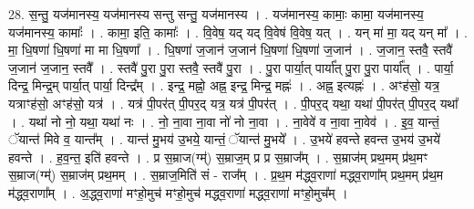 \documentclass[17pt]{extarticle}
\begin{document}
28. स॒न्तु॒ यज॑मानस्य॒ यज॑मानस्य सन्तु सन्तु॒ यज॑मानस्य । . यज॑मानस्य॒ कामाः॒ कामा॒ यज॑मानस्य॒ यज॑मानस्य॒ कामाः᳚ । . कामा॒ इति॒ कामाः᳚ । . वि॒वेष॒ यद् यद् वि॒वेष॑ वि॒वेष॒ यत् । . यन् मा॑ मा॒ यद् यन् मा᳚ । . मा॒ धि॒षणा॑ धि॒षणा॑ मा मा धि॒षणा᳚ । . धि॒षणा॑ ज॒जान॑ ज॒जान॑ धि॒षणा॑ धि॒षणा॑ ज॒जान॑ । . ज॒जान॒ स्तवै॒ स्तवै॑ ज॒जान॑ ज॒जान॒ स्तवै᳚ । . स्तवै॑ पु॒रा पु॒रा स्तवै॒ स्तवै॑ पु॒रा । . पु॒रा पार्या॒त् पार्या᳚त् पु॒रा पु॒रा पार्या᳚त् । . पार्या॒ दिन्द्र॒ मिन्द्र॒म् पार्या॒त् पार्या॒ दिन्द्र᳚म् । . इन्द्र॒ मह्नो॒ अह्न॒ इन्द्र॒ मिन्द्र॒ मह्नः॑ । . अह्न॒ इत्यह्नः॑ । . अꣳह॑सो॒ यत्र॒ यत्राꣳह॑सो॒ अꣳह॑सो॒ यत्र॑ । . यत्र॑ पी॒पर॑त् पी॒पर॒द् यत्र॒ यत्र॑ पी॒पर॑त् । . पी॒पर॒द् यथा॒ यथा॑ पी॒पर॑त् पी॒पर॒द् यथा᳚ । . यथा॑ नो नो॒ यथा॒ यथा॑ नः । . नो॒ ना॒वा ना॒वा नो॑ नो ना॒वा । . ना॒वेवे॑ व ना॒वा ना॒वेव॑ । . इ॒व॒ यान्तं॒ ॅयान्त॑ मिवे व॒ यान्त᳚म् । . यान्त॑ मु॒भय॑ उ॒भये॒ यान्तं॒ ॅयान्त॑ मु॒भये᳚ । . उ॒भये॑ हवन्ते हवन्त उ॒भय॑ उ॒भये॑ हवन्ते । . ह॒व॒न्त॒ इति॑ हवन्ते । . प्र स॒म्राज(ग्म्॑) स॒म्राज॒म् प्र प्र स॒म्राज᳚म् । . स॒म्राज॑म् प्रथ॒मम् प्र॑थ॒मꣳ स॒म्राज(ग्म्॑) स॒म्राज॑म् प्रथ॒मम् । . स॒म्राज॒मिति॑ सं - राज᳚म् । . प्र॒थ॒म म॑द्ध्व॒राणा॑ मद्ध्व॒राणा᳚म् प्रथ॒मम् प्र॑थ॒म म॑द्ध्व॒राणा᳚म् । . अ॒द्ध्व॒राणा॑ मꣳहो॒मुच॑ मꣳहो॒मुच॑ मद्ध्व॒राणा॑ मद्ध्व॒राणा॑ मꣳहो॒मुच᳚म् । \newline
\end{document}
